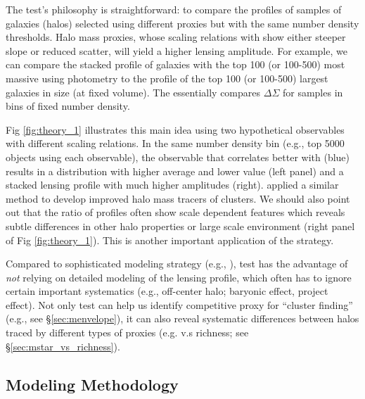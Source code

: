 \documentclass[fleqn,usenatbib,useAMS,english]{mnras}
\begin{document}
    The \topn{} test's philosophy is straightforward: to compare the \dsigma{}
    profiles of samples of galaxies (halos) selected using different \mvir{} proxies but with
    the same number density thresholds.
    Halo mass proxies, whose scaling relations with \mvir{} show either steeper slope or
    reduced scatter, will yield a higher lensing amplitude.
    For example, we can compare the stacked \dsigma{} profile of galaxies with
    the top 100 (or 100-500) most massive \mstar{} using \cmodel{} photometry to the profile
    of the top 100 (or 100-500) largest galaxies in size (at fixed volume). 
    The \topn{} essentially compares $\Delta\Sigma$ for samples in bins of fixed number density.

    Fig \ref{fig:theory_1} illustrates this main idea using two hypothetical observables with
    different \mvir{} scaling relations.
    In the same number density bin (e.g., top 5000 objects using each observable), the observable
    that correlates better with \mvir{} (blue) results in a \mvir{} distribution with higher
    average \mhalo{} and lower \sigmh{} value (left panel) and a stacked lensing profile with
    much higher amplitudes (right).
    \citet[][]{Reyes2008} applied a similar method to develop improved halo mass tracers
    of clusters.
    We should also point out that the ratio of \dsigma{} profiles often show scale dependent
    features which reveals subtle differences in other halo properties or large scale environment
    (right panel of Fig \ref{fig:theory_1}).
    This is another important application of the \topn{} strategy.

    Compared to sophisticated modeling strategy (e.g., \citealt{Sonnenfeld2019}), \topn{} test
    has the advantage of \emph{not} relying on detailed modeling of the lensing profile, which
    often has to ignore certain important systematics (e.g., off-center halo; baryonic effect,
    project effect).
    Not only \topn{} test can help us identify competitive \mvir{} proxy for ``cluster finding''
    (e.g., see \S \ref{sec:menvelope}), it can also reveal systematic differences between halos
    traced by different types of proxies (e.g. \mstar{} v.s richness;
    see \S \ref{sec:mstar_vs_richness}).

\subsection{Modeling Methodology}
    \label{sec:model}
\end{document}
